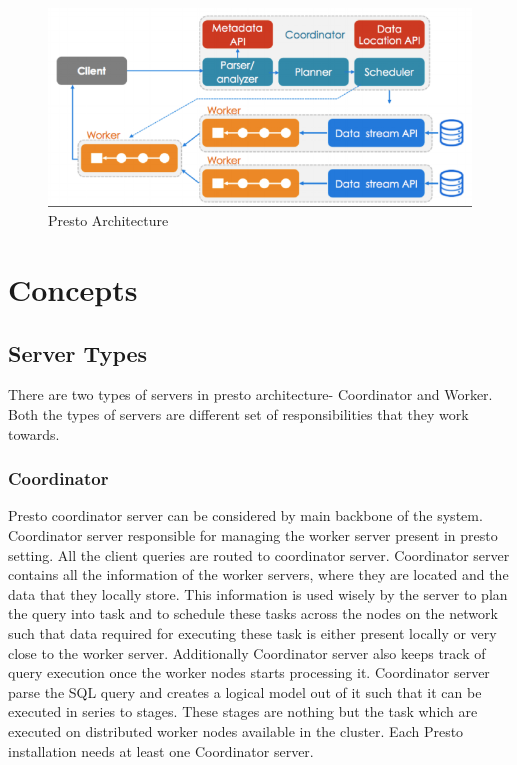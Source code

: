 \begin{figure}[!ht]
  \centering\includegraphics[width=\columnwidth]{image/presto-architecture.png}
  \caption{Presto Architecture}\label{f:architecture}
\end{figure}

\section{Concepts}
\subsection{Server Types}
There are two types of servers in presto architecture- Coordinator and Worker.
Both the types of servers are different set of responsibilities that they work
towards.
\subsubsection{Coordinator}
Presto coordinator server can be considered by main backbone of the system.
Coordinator server responsible for managing the worker server present in presto
setting. All the client queries are routed to coordinator server. Coordinator
server contains all the information of the worker servers, where they are
located and the data that they locally store. This information is used wisely
by the server to plan the query into task and to schedule these tasks across the
nodes on the network such that data required for executing these task is either
present locally or very close to the worker server. Additionally Coordinator
server also keeps track of query execution once the worker nodes starts
processing it.
Coordinator server parse the SQL query and creates a logical model out of it
such that it can be executed in series to stages. These stages are nothing but
the task which are executed on distributed worker nodes available in the
cluster. Each Presto installation needs at least one Coordinator server.

